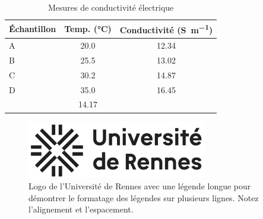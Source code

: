 \documentclass[12pt,a4paper]{report} %
\begin{document}
\dominitoc %



\tableofcontents
\listoffigures
\listoftables

\pagestyle{fancy}



\begin{table}[H]
  \centering
  \caption{Mesures de conductivité électrique}
  \label{tab:conductivite}
  \begin{tabular}{l S[table-format=2.1] S[table-format=3.2]}
    \toprule
    {Échantillon} & {Temp. (\si{\celsius})} & {Conductivité (\si{\siemens\per\meter})} \\
    \midrule
    A & 20.0 & 12.34 \\
    B & 25.5 & 13.02 \\
    C & 30.2 & 14.87 \\
    D & 35.0 & 16.45 \\
    \addlinespace
     & 14.17 \\
    \bottomrule
  \end{tabular}
\end{table}

\begin{figure}[htbp] 
    \centering
    \includegraphics[width=0.7\textwidth]{figures/logos/Logo_Univ_Rennes.png}
    \caption{Logo de l'Université de Rennes avec une légende longue pour démontrer le formatage des légendes sur plusieurs lignes. Notez l'alignement et l'espacement.}
    \label{fig:logo_rennes}
\end{figure}
\end{document}
